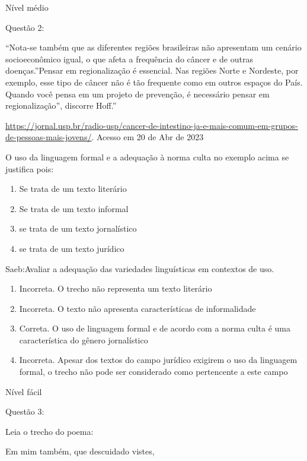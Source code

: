 {\begin{itemize}
\begin{itemize}
Nível médio

Questão 2:

``Nota-se também que as diferentes regiões brasileiras não apresentam um
cenário socioeconômico igual, o que afeta a frequência do câncer e de
outras doenças.''Pensar em regionalização é essencial. Nas regiões Norte
e Nordeste, por exemplo, esse tipo de câncer não é tão frequente como em
outros espaços do País. Quando você pensa em um projeto de prevenção, é
necessário pensar em regionalização'', discorre Hoff.''

\href{https://jornal.usp.br/radio-usp/cancer-de-intestino-ja-e-mais-comum-em-grupos-de-pessoas-mais-jovens/}{\uline{https://jornal.usp.br/radio-usp/cancer-de-intestino-ja-e-mais-comum-em-grupos-de-pessoas-mais-jovens/}}.
Acesso em 20 de Abr de 2023

O uso da linguagem formal e a adequação à norma culta no exemplo acima
se justifica pois:

\begin{enumerate}
\def\labelenumi{\alph{enumi})}
\item
  Se trata de um texto literário
\item
  Se trata de um texto informal
\item
  se trata de um texto jornalístico
\item
  se trata de um texto jurídico
\end{enumerate}

Saeb:Avaliar a adequação das variedades linguísticas em contextos de
uso.

\begin{enumerate}
\def\labelenumi{\arabic{enumi}.}
\item
  Incorreta. O trecho não representa um texto literário
\item
  Incorreta. O texto não apresenta características de informalidade
\item
  Correta. O uso de linguagem formal e de acordo com a norma culta é uma
  característica do gênero jornalístico
\item
  Incorreta. Apesar dos textos do campo jurídico exigirem o uso da
  linguagem formal, o trecho não pode ser considerado como pertencente a
  este campo
\end{enumerate}

Nível fácil

Questão 3:

Leia o trecho do poema:

Em mim também, que descuidado vistes,


\end{itemize}
\end{itemize}}
